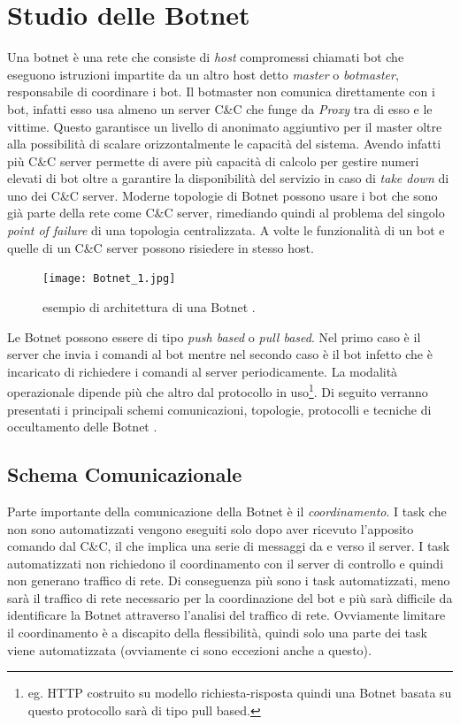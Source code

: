 

\chapter{Studio delle Botnet}

Una botnet è una rete che consiste di  \textit{host} compromessi chiamati bot che eseguono istruzioni impartite da un altro host detto \textit{master} o \textit{botmaster}, responsabile di coordinare i bot. Il botmaster non comunica direttamente con i bot, infatti esso usa almeno un server C\&C che funge da \textit{Proxy} tra di esso e le vittime. Questo garantisce un livello di anonimato aggiuntivo per il master oltre alla possibilità di scalare orizzontalmente le capacità del sistema. Avendo infatti più C\&C server permette di avere più capacità di calcolo per gestire numeri elevati di bot oltre a garantire la disponibilità del servizio in caso di \textit{take down} di uno dei C\&C server. Moderne topologie di Botnet possono usare i bot che sono già parte della rete come C\&C server, rimediando quindi al problema del singolo \textit{point of failure} di una topologia centralizzata.
A volte le funzionalità di un bot e quelle di un C\&C server possono risiedere in stesso host.

\begin{figure}[htb]
    \centering
    \texttt{[image: Botnet\_1.jpg]}
    \caption{esempio di architettura di una Botnet \cite{BotnetExampleImage}.}
    \label{fig:botnetexample}
\end{figure}
Le Botnet possono essere di tipo \textit{push based} o \textit{pull based}. Nel primo caso è il server che invia i comandi al bot mentre nel secondo caso è il bot infetto che è incaricato di richiedere i comandi al server periodicamente.
 La modalità operazionale  dipende più che altro dal protocollo in uso\footnote{eg. HTTP costruito su modello richiesta-risposta quindi una Botnet basata su questo protocollo sarà di tipo pull based.}.
 Di seguito verranno presentati i principali schemi comunicazioni, topologie, protocolli e tecniche di occultamento delle Botnet \cite{vormayr2017botnet,vuong2011advanced}.


\section{Schema Comunicazionale}
Parte importante della comunicazione della Botnet è il \textit{coordinamento}. I task che non sono automatizzati vengono eseguiti solo dopo aver ricevuto l'apposito comando dal C\&C, il che implica una serie di messaggi da e verso il server. I task automatizzati non richiedono il coordinamento con il server di controllo e quindi non generano traffico di rete. Di conseguenza più sono i task automatizzati, meno sarà il traffico di rete necessario per la coordinazione del bot e più sarà difficile da identificare la Botnet attraverso l'analisi del traffico di rete. Ovviamente limitare il coordinamento è a discapito della flessibilità, quindi solo una parte dei task viene automatizzata (ovviamente ci sono eccezioni anche a questo). 

